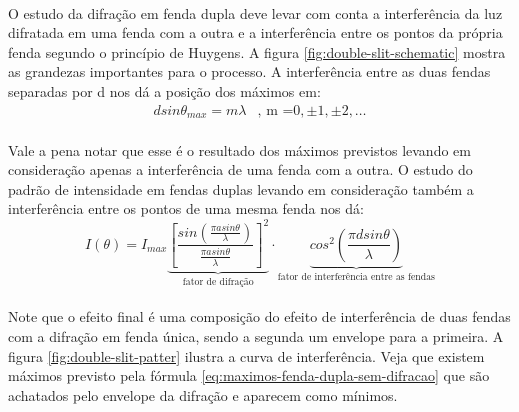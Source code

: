 \documentclass[a4paper,11pt]{article}
\begin{document}
\paragraph{} O estudo da difração em fenda dupla deve levar com
 conta a interferência da luz difratada em uma fenda com a
 outra e a interferência entre os pontos da
própria fenda segundo o princípio de Huygens.
 A figura \ref{fig:double-slit-schematic}
mostra as grandezas importantes para o processo.
A interferência entre as duas fendas separadas por d
 nos dá a posição dos máximos em:
\begin{equation}
	\begin{array}{ll}
		d sin \theta _{max} = m \lambda & \mbox{, m =} 0,
					 \pm 1, \pm 2, \ldots  
	\end{array}
	\label{eq:maximos-fenda-dupla-sem-difracao}
\end{equation}

\paragraph{}Vale a pena notar que esse é o resultado dos máximos previstos
levando em consideração apenas a interferência de uma fenda com a outra. 
O estudo do padrão de intensidade em fendas duplas levando em consideração
também a interferência entre os pontos de uma mesma fenda nos dá:
\begin{equation}
	I(\theta) =
	 I_{max} 
	    \underbrace
	      {
	      \left[
	 			\frac{
	 				sin\left(
	 					\frac{\pi a sin \theta}{\lambda}
	 					\right)
	 				}
					{
					\frac{\pi a sin \theta}{\lambda}
					}
				\right]^2
				}_\textrm{fator de difração}
				\cdot
				\underbrace
				{
				cos^2 
				  \left(
				      \frac
				        {\pi d sin \theta}
				        {\lambda}
				  \right)
				}_\textrm{fator de interferência entre as fendas}
	\label{eq:doble-slit-intensity-pattern}
\end{equation}

\paragraph{}Note que o efeito final é uma composição do efeito de interferência
de duas fendas com a difração em fenda única,
 sendo a segunda um envelope para a primeira.
A figura \ref{fig:double-slit-patter} ilustra
 a curva de interferência. Veja que existem máximos
previsto pela fórmula \ref{eq:maximos-fenda-dupla-sem-difracao}
 que são achatados pelo envelope da 
difração e aparecem como mínimos.
\end{document}
